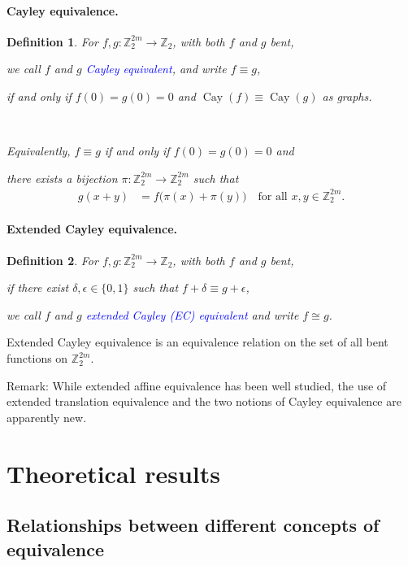 \documentclass[12pt,a4paper]{article}
\newcommand{\mb}[1]{\mathbb{#1}}
\newcommand{\Z}{\mb{Z}}
\newcommand{\To}{\rightarrow}
\newcommand{\Emph}[1]{\emph{\textcolor{blue}{#1}}}
\newcommand{\Cay}[1]{\operatorname{Cay}\left(#1\right)}
\newtheorem{Definition}{Definition}
\begin{document}
\paragraph*{Cayley equivalence.}
\begin{Definition}
%
For $f, g : \Z_2^{2m} \To \Z_2$, with both $f$ and $g$ bent,

we call $f$ and $g$ \Emph{Cayley equivalent},
and write $f \equiv g$,

if and only if $f(0)=g(0)=0$ and $\Cay{f} \equiv \Cay{g}$ as graphs.

~

Equivalently, $f \equiv g$ if and only if $f(0)=g(0)=0$ and

there exists a bijection $\pi : \Z_2^{2m} \To \Z_2^{2m}$ such that
\begin{align*}
g(x+y) &= f \big(\pi(x)+\pi(y)\big) \quad \text{for all~} x,y \in \Z_2^{2m}.
\end{align*}
\end{Definition}
\paragraph*{Extended Cayley equivalence.}
\begin{Definition}
For $f, g : \Z_2^{2m} \To \Z_2$, with both $f$ and $g$ bent,

if there exist $\delta, \epsilon \in \{0,1\}$ such that $f + \delta \equiv g + \epsilon$,

we call $f$ and $g$ \Emph{extended Cayley (EC) equivalent} and write $f \cong g$.
\end{Definition}
Extended Cayley equivalence is an equivalence relation on the set of all bent functions on
$\Z_2^{2m}$.

Remark: While extended affine equivalence has been well studied,
the use of extended translation equivalence and the two notions of Cayley equivalence are
apparently new.

\section{Theoretical results}
\label{sec-Results}

\subsection{Relationships between different concepts of equivalence}
\end{document}
